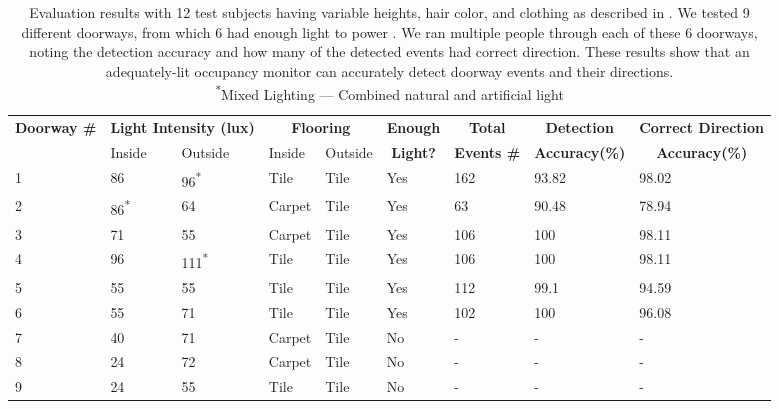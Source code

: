 \begin{table}[t]
	\begin{tabular}{@{}p{0.8in}p{0.6in}p{0.5in}p{0.45in}p{0.6in}p{0.3in}p{0.7in}p{0.7in}p{0.7in}@{}}
	\toprule
	\multirow{2}{*}{\textbf{Doorway \#}}	&	\multicolumn{2}{c}{\textbf{Light Intensity (lux)}} & \multicolumn{2}{c}{\textbf{Flooring}} & \multicolumn{1}{c}{\textbf{Enough}} & \multicolumn{1}{c}{\textbf{Total}} & \multicolumn{1}{c}{\textbf{Detection}} & \multicolumn{1}{c}{\textbf{Correct Direction}} 		\\
	& Inside & Outside & Inside & Outside & \multicolumn{1}{c}{\textbf{Light?}} & \multicolumn{1}{c}{\textbf{Events \#}} & \multicolumn{1}{c}{\textbf{Accuracy(\%)}} & \multicolumn{1}{c}{\textbf{Accuracy(\%)}}\\\midrule
	1 & 86 & 96\textsuperscript{*} & Tile & Tile & Yes & 162 & 93.82 & 98.02 \\ %
	2 & 86\textsuperscript{*} & 64 & Carpet & Tile & Yes & 63 & 90.48 & 78.94 \\ %
	3 & 71 & 55 & Carpet & Tile & Yes & 106 & 100 & 98.11 \\	%
	4 & 96 & 111\textsuperscript{*} & Tile & Tile & Yes & 106 & 100 & 98.11 \\ %
	5 & 55 & 55 & Tile & Tile & Yes & 112 & 99.1 & 94.59 \\ %
	6 & 55 & 71 & Tile & Tile & Yes & 102 & 100 & 96.08 \\\midrule %
	7 & 40 & 71 & Carpet & Tile & No & - & - & - \\ %
	8 & 24 & 72 & Carpet & Tile & No & - & - & - \\ %
	9 & 24 & 55 & Tile & Tile & No & - & - & - \\ %
	\bottomrule
	\end{tabular}
	\caption{Evaluation results with 12 test subjects having variable heights, hair color, and clothing as described in . We tested 9 different doorways, from which 6 had enough light to power \sysname. We ran multiple people through each of these 6 doorways, noting the detection accuracy and how many of the detected events had correct direction. These results show that an adequately-lit \sysname occupancy monitor can accurately detect doorway events and their directions.
	\vspace{1mm}
	\\\textsuperscript{*}Mixed Lighting --- Combined natural and artificial light
	\label{tab:detection}}

\end{table}


